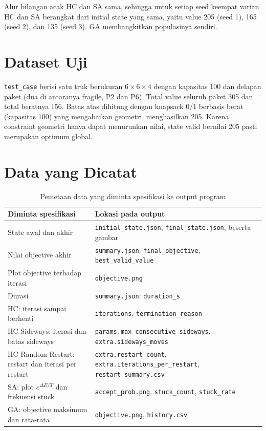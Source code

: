 \documentclass[12pt,a4paper]{report}
\newcommand{\hd}[1]{\cellcolor{hdr}\textbf{#1}}
\newcommand{\code}[1]{\texttt{\small #1}}
\begin{document}
Alur bilangan acak HC dan SA sama, sehingga untuk setiap seed keempat varian HC dan SA berangkat
dari initial state yang sama, yaitu value 205 (seed 1), 165 (seed 2), dan 135 (seed 3).
GA membangkitkan populasinya sendiri.

\section{Dataset Uji}
\code{test\_case} berisi satu truk berukuran $6 \times 6 \times 4$ dengan kapasitas 100 dan delapan
paket (dua di antaranya fragile, P2 dan P6). Total value seluruh paket 305 dan total beratnya 156.
Batas atas dihitung dengan knapsack 0/1 berbasis berat (kapasitas 100) yang mengabaikan geometri,
menghasilkan 205. Karena constraint geometri hanya dapat menurunkan nilai, state valid bernilai
205 pasti merupakan optimum global.

\section{Data yang Dicatat}
\begin{table}[H]
\centering
\caption{Pemetaan data yang diminta spesifikasi ke output program}
\small
\begin{tabular}{|L{6cm}|L{7.2cm}|}
\hline
\hd{Diminta spesifikasi} & \hd{Lokasi pada output} \\ \hline
State awal dan akhir & \code{initial\_state.json}, \code{final\_state.json}, beserta gambar \\ \hline
Nilai objective akhir & \code{summary.json}: \code{final\_objective}, \code{best\_valid\_value} \\ \hline
Plot objective terhadap iterasi & \code{objective.png} \\ \hline
Durasi & \code{summary.json}: \code{duration\_s} \\ \hline
HC: iterasi sampai berhenti & \code{iterations}, \code{termination\_reason} \\ \hline
HC Sideways: iterasi dan batas sideways & \code{params.max\_consecutive\_sideways}, \code{extra.sideways\_moves} \\ \hline
HC Random Restart: restart dan iterasi per restart & \code{extra.restart\_count}, \code{extra.iterations\_per\_restart}, \code{restart\_summary.csv} \\ \hline
SA: plot $e^{\Delta E/T}$ dan frekuensi stuck & \code{accept\_prob.png}, \code{stuck\_count}, \code{stuck\_rate} \\ \hline
GA: objective maksimum dan rata-rata & \code{objective.png}, \code{history.csv} \\ \hline
\end{tabular}
\end{table}
\end{document}
